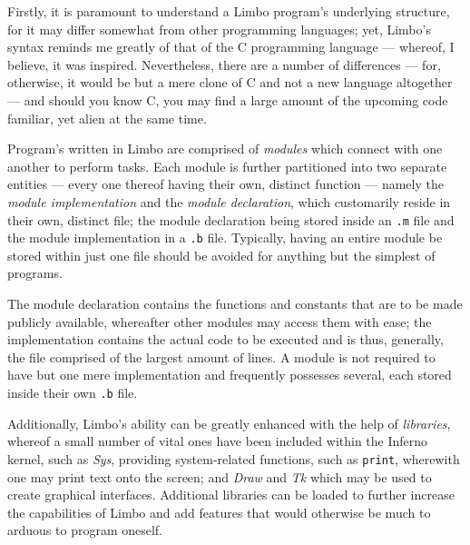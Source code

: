 \documentclass[a5paper,twoside,12pt]{report}
\begin{document}
Firstly, it is paramount to understand a Limbo program's underlying structure, for it may differ somewhat from other programming languages; yet, Limbo's syntax reminds me greatly of that of the C programming language — whereof, I believe, it was inspired. Nevertheless, there are a number of differences — for, otherwise, it would be but a mere clone of C and not a new language altogether — and should you know C, you may find a large amount of the upcoming code familiar, yet alien at the same time.

Program's written in Limbo are comprised of \textit{modules} which connect with one another to perform tasks. Each module is further partitioned into two separate entities — every one thereof having their own, distinct function — namely the \textit{module implementation} and the \textit{module declaration}, which customarily reside in their own, distinct file; the module declaration being stored inside an \texttt{.m} file and the module implementation in a \texttt{.b} file. Typically, having an entire module be stored within just one file should be avoided for anything but the simplest of programs. 

The module declaration contains the functions and constants that are to be made publicly available, whereafter other modules may access them with ease; the implementation contains the actual code to be executed and is thus, generally, the file comprised of the largest amount of lines. A module is not required to have but one mere implementation and frequently possesses several, each stored inside their own \texttt{.b} file.

Additionally, Limbo's ability can be greatly enhanced with the help of \textit{libraries}, whereof a small number of vital ones have been included within the Inferno kernel, such as \textit{Sys}, providing system-related functions, such as \texttt{print}, wherewith one may print text onto the screen; and \textit{Draw} and \textit{Tk} which may be used to create graphical interfaces. Additional libraries can be loaded to further increase the capabilities of Limbo and add features that would otherwise be much to arduous to program oneself.
\end{document}
